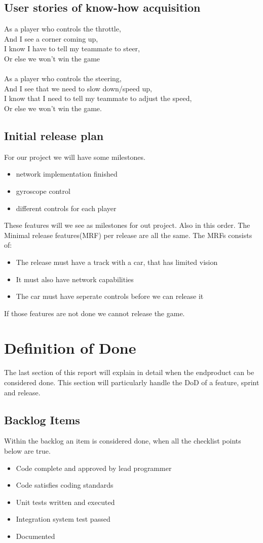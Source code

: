 \documentclass{article}
\begin{document}
\subsection{User stories of know-how acquisition}
As a player who controls the throttle,\\
And I see a corner coming up,\\
I know I have to tell my teammate to steer,\\
Or else we won’t win the game\\
\\
As a player who controls the steering,\\
And I see that we need to slow down/speed up,\\
I know that I need to tell my teammate to adjust the speed,\\
Or else we won’t win the game.\\
\subsection{Initial release plan}
For our project we will have some milestones.\\
\begin{itemize}
\item network implementation finished
\item gyroscope control
\item different controls for each player
\end{itemize}
These features will we see as milestones for out project. Also in this order.
The Minimal release features(MRF) per release are all the same. The MRFs consists of:
\begin{itemize}
\item The release must have a track with a car, that has limited vision
\item It must also have network capabilities
\item The car must have seperate controls before we can release it
\end{itemize}
If those features are not done we cannot release the game.
\section{Definition of Done}
The last section of this report will explain in detail when the endproduct can be considered done. This section will particularly handle the DoD of a feature, sprint and release.
\subsection{Backlog Items}
Within the backlog an item is considered done, when all the checklist points below are true.
\begin{itemize}
	\item Code complete and approved by lead programmer
	\item Code satisfies coding standards
	\item Unit tests written and executed
	\item Integration system test passed
	\item Documented
\end{itemize}
\end{document}
